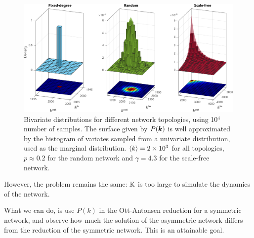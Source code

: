 \begin{figure}[ht]
\centering
\includegraphics[width = \textwidth]{../Figures/Distributions/2D.pdf}
\caption{Bivariate distributions for different network topologies, using 10$^4$ number of samples. The surface given by $P({\boldsymbol{k}})$ is well approximated by the histogram of variates sampled from a univariate distribution, used as the marginal distribution. ${\langle k\rangle} =  2 \times 10^3$ for all topologies, $p \approx 0.2$ for the random network and $\gamma = 4.3$ for the scale-free network.}
\label{fig:2Ddistributions}
\end{figure}
However, the problem remains the same: ${\mathbb{K}}$ is too large to simulate the dynamics of the network. 

What we can do, is use $P(k)$ in the Ott-Antonsen reduction for a symmetric network, and observe how much the solution of the asymmetric network differs from the reduction of the symmetric network. This is an attainable goal.

